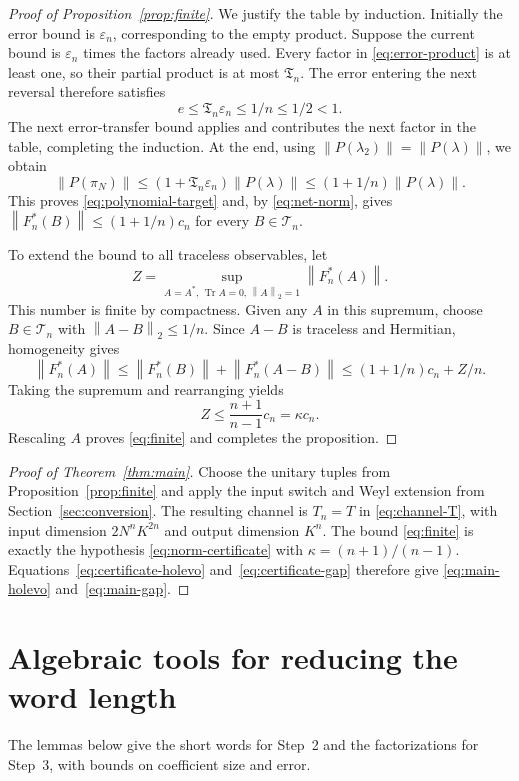 \documentclass[11pt]{article}
\numberwithin{equation}{section}
\theoremstyle{boldremark}\newtheorem{remark}[theorem]{Remark}
\DeclareMathOperator{\Tr}{Tr}
\newcommand{\norm}[1]{\left\lVert #1\right\rVert}
\begin{document}
\begin{proof}[Proof of Proposition~\ref{prop:finite}]
We justify the table by induction. Initially the error bound is
$\varepsilon_n$, corresponding to the empty product. Suppose the
current bound is $\varepsilon_n$ times the factors already used.
Every factor in \eqref{eq:error-product} is at least one, so their
partial product is at most $\mathfrak T_n$. The error entering the
next reversal therefore satisfies
\[
 e\le\mathfrak T_n\varepsilon_n\le1/n\le1/2<1.
\]
The next error-transfer bound applies and contributes the next
factor in the table, completing the induction.
At the end, using $\norm{P(\lambda_2)}=\norm{P(\lambda)}$, we obtain
\[
 \norm{P(\pi_N)}
 \le(1+\mathfrak T_n\varepsilon_n)\norm{P(\lambda)}
 \le(1+1/n)\norm{P(\lambda)}.
\]
This proves \eqref{eq:polynomial-target} and, by \eqref{eq:net-norm}, gives
$\norm{F_n^*(B)}\le(1+1/n)c_n$ for every $B\in\mathcal T_n$.

To extend the bound to all traceless observables, let
\[
 Z=\sup_{A=A^*,\,\Tr A=0,\,\norm A_2=1}\norm{F_n^*(A)}.
\]
This number is finite by compactness. Given any $A$ in this supremum,
choose $B\in\mathcal T_n$ with $\norm{A-B}_2\le1/n$.
Since $A-B$ is traceless and Hermitian, homogeneity gives
\[
 \norm{F_n^*(A)}
 \le\norm{F_n^*(B)}+\norm{F_n^*(A-B)}
 \le(1+1/n)c_n+Z/n.
\]
Taking the supremum and rearranging yields
\[
 Z\le\frac{n+1}{n-1}c_n=\kappa c_n.
\]
Rescaling $A$ proves \eqref{eq:finite} and completes the proposition.
\end{proof}

\begin{proof}[Proof of Theorem~\ref{thm:main}]
Choose the unitary tuples from Proposition~\ref{prop:finite} and apply
the input switch and Weyl extension from Section~\ref{sec:conversion}.
The resulting channel is $T_n=T$ in \eqref{eq:channel-T}, with input
dimension $2N^nK^{2n}$ and output dimension $K^n$.
The bound \eqref{eq:finite} is exactly the hypothesis
\eqref{eq:norm-certificate} with $\kappa=(n+1)/(n-1)$.
Equations~\eqref{eq:certificate-holevo} and~\eqref{eq:certificate-gap}
therefore give \eqref{eq:main-holevo} and~\eqref{eq:main-gap}.
\end{proof}

\appendix
\section{Algebraic tools for reducing the word length}
\label{app:operators}

The lemmas below give the short words for Step~2 and the
factorizations for Step~3, with bounds on coefficient size and error.
\end{document}
